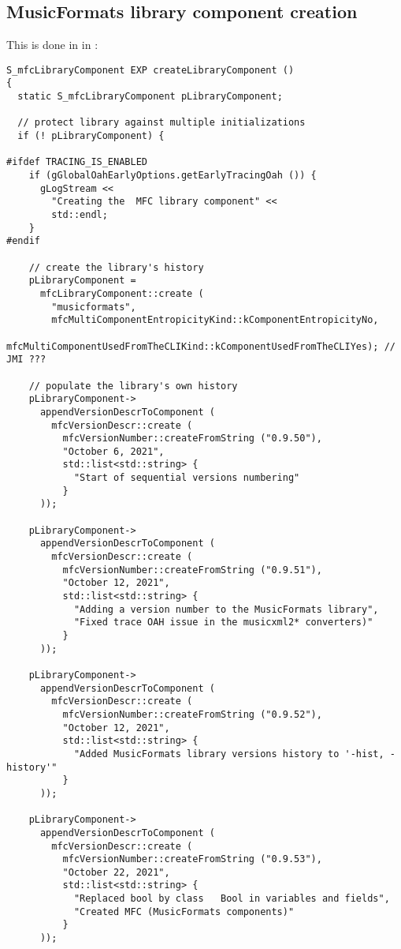\subsection{MusicFormats library component creation}\label{MusicFormats library component creation}

This is done in  in :
\begin{lstlisting}[language=CPlusPlus]
S_mfcLibraryComponent EXP createLibraryComponent ()
{
  static S_mfcLibraryComponent pLibraryComponent;

  // protect library against multiple initializations
  if (! pLibraryComponent) {

#ifdef TRACING_IS_ENABLED
    if (gGlobalOahEarlyOptions.getEarlyTracingOah ()) {
      gLogStream <<
        "Creating the  MFC library component" <<
        std::endl;
    }
#endif

    // create the library's history
    pLibraryComponent =
      mfcLibraryComponent::create (
        "musicformats",
        mfcMultiComponentEntropicityKind::kComponentEntropicityNo,
        mfcMultiComponentUsedFromTheCLIKind::kComponentUsedFromTheCLIYes); // JMI ???

    // populate the library's own history
    pLibraryComponent->
      appendVersionDescrToComponent (
        mfcVersionDescr::create (
          mfcVersionNumber::createFromString ("0.9.50"),
          "October 6, 2021",
          std::list<std::string> {
            "Start of sequential versions numbering"
          }
      ));

    pLibraryComponent->
      appendVersionDescrToComponent (
        mfcVersionDescr::create (
          mfcVersionNumber::createFromString ("0.9.51"),
          "October 12, 2021",
          std::list<std::string> {
            "Adding a version number to the MusicFormats library",
            "Fixed trace OAH issue in the musicxml2* converters)"
          }
      ));

    pLibraryComponent->
      appendVersionDescrToComponent (
        mfcVersionDescr::create (
          mfcVersionNumber::createFromString ("0.9.52"),
          "October 12, 2021",
          std::list<std::string> {
            "Added MusicFormats library versions history to '-hist, -history'"
          }
      ));

    pLibraryComponent->
      appendVersionDescrToComponent (
        mfcVersionDescr::create (
          mfcVersionNumber::createFromString ("0.9.53"),
          "October 22, 2021",
          std::list<std::string> {
            "Replaced bool by class   Bool in variables and fields",
            "Created MFC (MusicFormats components)"
          }
      ));


\end{lstlisting}
